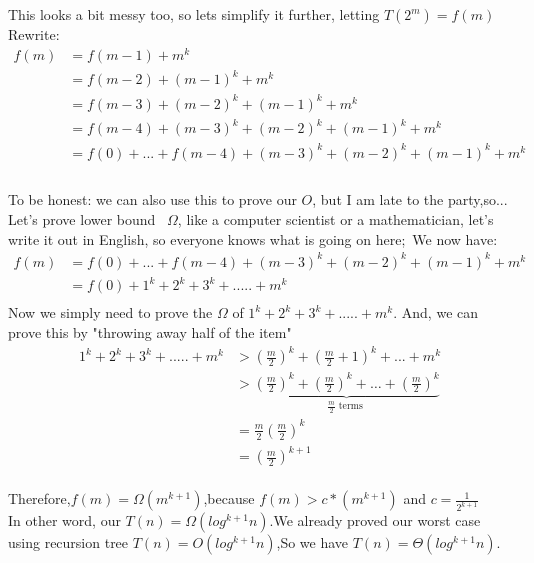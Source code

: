 \documentclass{article}
\begin{document}
This looks a bit messy too, so lets simplify it further, letting $T(2^m)=f(m)$\\
Rewrite:
\begin{equation*}
\begin{split}
f(m)&=f(m-1)+m^k\\&=f(m-2)+(m-1)^k+m^k\\
    &=f(m-3)+(m-2)^k+(m-1)^k+m^k\\
    &=f(m-4)+(m-3)^k+(m-2)^k+(m-1)^k+m^k\\
    &=f(0)+...+f(m-4)+(m-3)^k+(m-2)^k+(m-1)^k+m^k\\
    \end{split}\end{equation*}
 \\
To be honest: we can also use this to prove our $O$, but I am late to the party,so...\\
Let's prove lower bound \ $\Omega$, like a computer scientist or a mathematician, let's write it out in English, so everyone knows what is going on here;\ 
We now have:
\begin{equation*}
\begin{split}
 f(m)&=f(0)+...+f(m-4)+(m-3)^k+(m-2)^k+(m-1)^k+m^k\\
        &=f(0)+1^k+2^k+3^k+.....+m^k \\
    \end{split}\end{equation*}
Now we simply need to prove the $\Omega$ of $1^k+2^k+3^k+.....+m^k$.        
And, we can prove this by "throwing away half of the item"
\begin{equation*}
    \begin{split}
1^k+2^k+3^k+.....+m^k &> (\frac{m}{2})^k+ (\frac{m}{2}+1)^k +...+m^k\\ 
                     &>\underbrace{\left(\frac{m}{2}\right)^{k}+\left(\frac{m}{2}\right)^{k}+\ldots+\left(\frac{m}{2}\right)^{k}}_{\frac{m}{2} \text { terms }}\\
                     &=\frac{m}{2}\left(\frac{m}{2}\right)^{k}\\
                     &=(\frac{m}{2})^{k+1}\\
    \end{split}
\end{equation*}

Therefore,$f(m)=\Omega(m^{k+1})$,because $f(m)>c*(m^{k+1})$ and $c=\frac{1}{2^{k+1}}$\\
In other word, our $T(n)=\Omega(log^{k+1}n)$.We already proved our worst case using recursion tree $T(n)=O(log^{k+1}n)$,So we have $T(n)=\Theta(log^{k+1}n)$. 
 \newpage
\end{document}
